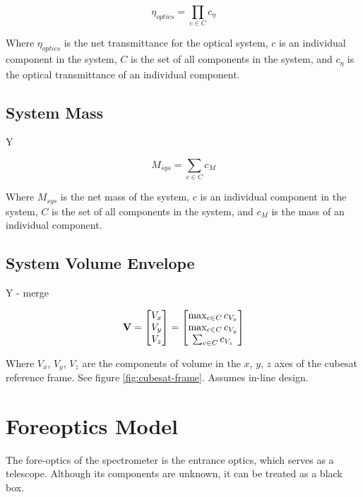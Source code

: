 \begin{equation}
    \eta_{optics} = \prod_{c \in C} c_{\eta}
\end{equation}

Where $\eta_{optics}$ is the net transmittance for the optical system, $c$ is an individual component in the system, $C$ is the set of all components in the system, and $c_{\eta}$ is the optical transmittance of an individual component.

\subsection{System Mass} Y

\begin{equation}
    M_{sys} = \sum_{c \in C} c_M
\end{equation}

Where $M_{sys}$ is the net mass of the system, $c$ is an individual component in the system, $C$ is the set of all components in the system, and $c_{M}$ is the mass of an individual component.

\subsection{System Volume Envelope} Y - merge

\begin{equation}
\bf{V} = \begin{bmatrix} V_x\\ V_y\\ V_z \end{bmatrix} = \begin{bmatrix} \max_{c \in C} c_{V_x}\\ \max_{c \in C} c_{V_y}\\ \sum_{c \in C} c_{V_z} \end{bmatrix}
\end{equation}

Where $V_x$, $V_y$, $V_z$ are the components of volume in the $x$, $y$, $z$ axes of the cubesat reference frame. See figure \ref{fig:cubesat-frame}. Assumes in-line design.

\section{Foreoptics Model} 
The fore-optics of the spectrometer is the entrance optics, which serves as a telescope. Although its components are unknown, it can be treated as a black box.

